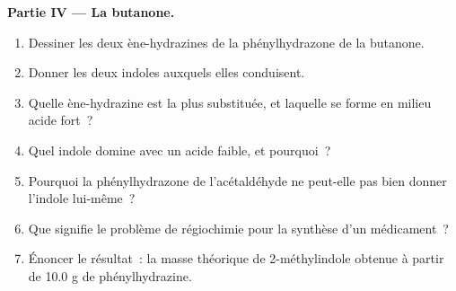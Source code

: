 \begin{problem}
\medskip\noindent\textbf{Partie IV --- La butanone.}
\begin{enumerate}[resume]
  \item Dessiner les deux ène-hydrazines de la phénylhydrazone de la
        butanone.
  \item Donner les deux indoles auxquels elles conduisent.
  \item Quelle ène-hydrazine est la plus substituée, et laquelle se forme
        en milieu acide fort~?
  \item Quel indole domine avec un acide faible, et pourquoi~?
  \item Pourquoi la phénylhydrazone de l'acétaldéhyde ne peut-elle pas
        bien donner l'indole lui-même~?
  \item Que signifie le problème de régiochimie pour la synthèse d'un
        médicament~?
  \item Énoncer le résultat~: la masse théorique de 2-méthylindole obtenue
        à partir de 10.0 g de phénylhydrazine.
\end{enumerate}
\end{problem}
